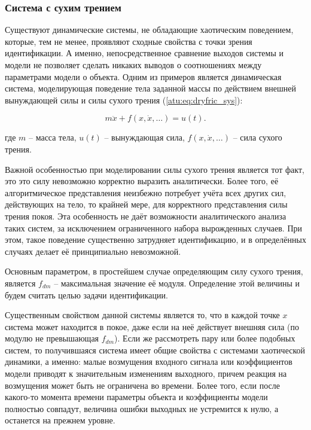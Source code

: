 
\FloatBarrier
\subsubsection{Система с сухим трением} %


Существуют динамические системы, не обладающие хаотическим поведением,
которые, тем не менее, проявляют сходные свойства с точки зрения идентификации.
А именно, непосредственное сравнение выходов системы и модели не позволяет
сделать никаких выводов о соотношениях между параметрами модели о объекта.
Одним из примеров является динамическая система, моделирующая поведение
тела заданной массы по действием внешней вынуждающей силы
и силы сухого трения
\cite{berger_friction,atu_asau11}
(\ref{atu:eq:dryfric_sys}):

\begin{equation}
 m \ddot{x} + f( x, \dot{x}, \ldots)  = u(t).
\label{atu:eq:dryfric_sys}
\end{equation}

\noindent
где
$m$ -- масса тела,
$u(t)$ -- вынуждающая сила,
$ f( x, \dot{x}, \ldots)  $ -- сила сухого трения.

Важной особенностью при моделировании силы сухого трения является тот факт,
это это силу невозможно корректно выразить аналитически. Более того,
её алгоритмическое представления неизбежно потребует учёта всех других сил,
действующих на тело, то крайней мере, для корректного представления
силы трения покоя. Эта особенность не даёт возможности
аналитического анализа таких систем, за исключением ограниченного набора
вырожденных случаев. При этом, такое поведение существенно затрудняет идентификацию,
и в определённых случаях делает её принципиально невозможной.

Основным параметром, в простейшем случае определяющим силу сухого
трения, является $f_{dm}$ -- максимальная значение её модуля.
Определение этой величины и будем считать целью задачи идентификации.

Существенным свойством данной системы является то, что в каждой точке \(x\)
система может находится в покое, даже если на неё действует
внешняя сила (по модулю не превышающая $f_{dm}$).
Если же рассмотреть пару или более подобных систем,
то получившаяся система имеет общие свойства с системами
хаотической динамики, а именно: малые возмущения входного сигнала
или коэффициентов модели приводят к значительным изменениям
выходного, причем реакция на возмущения может быть
не ограничена во времени.
Более того, если после какого-то момента времени
параметры объекта и коэффициенты модели полностью совпадут,
величина ошибки выходных не устремится к нулю, а останется на прежнем уровне.

